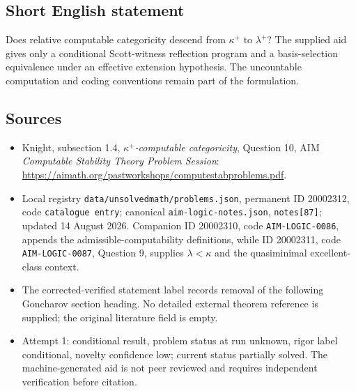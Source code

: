 \documentclass[11pt]{article}
\begin{document}
\subsection{Short English statement}
Does relative computable categoricity descend from \(\kappa^+\) to \(\lambda^+\)? The supplied aid gives only a conditional Scott-witness reflection program and a basis-selection equivalence under an effective extension hypothesis. The uncountable computation and coding conventions remain part of the formulation.
\subsection{Sources}
\begin{itemize}
\item Knight, subsection 1.4, \emph{\(\kappa^+\)-computable categoricity}, Question 10, AIM \emph{Computable Stability Theory Problem Session}: \url{https://aimath.org/pastworkshops/computestabproblems.pdf}.
\item Local registry \texttt{data/unsolvedmath/problems.json}, permanent ID 20002312, code \texttt{catalogue entry}; canonical \texttt{aim-logic-notes.json}, \texttt{notes[87]}; updated 14 August 2026. Companion ID 20002310, code \texttt{AIM-LOGIC-0086}, appends the admissible-computability definitions, while ID 20002311, code \texttt{AIM-LOGIC-0087}, Question 9, supplies \(\lambda<\kappa\) and the quasiminimal excellent-class context.
\item The corrected-verified statement label records removal of the following Goncharov section heading. No detailed external theorem reference is supplied; the original literature field is empty.
\item Attempt 1: conditional result, problem status at run unknown, rigor label conditional, novelty confidence low; current status partially solved. The machine-generated aid is not peer reviewed and requires independent verification before citation.
\end{itemize}
\end{document}

